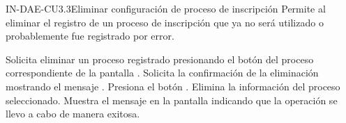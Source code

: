 \begin{UseCase}{IN-DAE-CU3.3}{Eliminar configuración de proceso de inscripción}{
	Permite al  eliminar el registro de un proceso de inscripción que ya no será utilizado o probablemente fue registrado por error.
	}
{\begin{Titemize}
	\end{Titemize}}
	
\end{UseCase}


\begin{UCtrayectoria}
	\UCpaso [\UCactor] Solicita eliminar un proceso registrado presionando el botón {\IUEliminar} del proceso correspondiente de la pantalla .
	\UCpaso Solicita la confirmación de la eliminación mostrando el mensaje .
	\UCpaso [\UCactor] \label{IN-DAE-CU3.3:Eliminar}Presiona el botón . 
	\UCpaso Elimina la información del proceso seleccionado. 
	\UCpaso Muestra el mensaje  en la pantalla  indicando que la operación se llevo a cabo de manera exitosa.
	

\end{UCtrayectoria}

